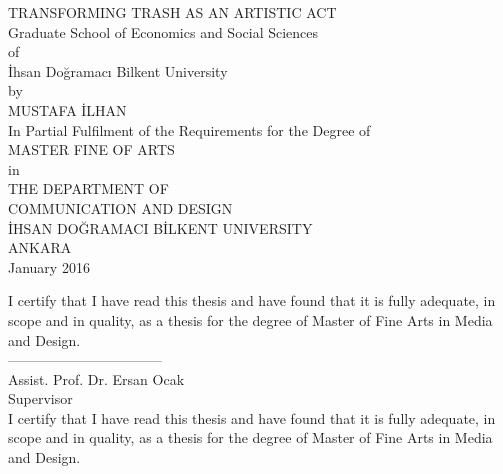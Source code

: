 \documentclass[12pt]{report}
\begin{document}
\clearpage
\thispagestyle{empty}
\singlespacing
	\begin{center}
        
        \vspace*{25mm}
        TRANSFORMING TRASH AS AN ARTISTIC ACT\\
        \vspace*{4\baselineskip}
        Graduate School of Economics and Social Sciences\\
        of\\
		İhsan Doğramacı Bilkent University\\
		\vspace*{3\baselineskip}
        by\\
       	\vspace*{3\baselineskip}
        MUSTAFA İLHAN\\
        \vspace*{4\baselineskip}
        In Partial Fulfilment of the Requirements for the Degree of\\
		MASTER FINE OF ARTS\\
        \vspace{2\baselineskip}
        in\\
        \vspace{2\baselineskip}
        THE DEPARTMENT OF\\
        COMMUNICATION AND DESIGN\\
       	İHSAN DOĞRAMACI BİLKENT UNIVERSITY\\
        ANKARA\\
        \vspace{\baselineskip}
        January 2016
	\end{center}
\clearpage


\clearpage
\thispagestyle{empty}
\singlespacing
\noindent I certify that I have read this thesis and have found that it is fully adequate, in scope and in quality, as a thesis for the degree of Master of Fine Arts in Media and Design.\\

\noindent---------------------------------\\
Assist. Prof. Dr. Ersan Ocak\\
Supervisor\\

\noindent I certify that I have read this thesis and have found that it is fully adequate, in scope and in quality, as a thesis for the degree of Master of Fine Arts in Media and Design.\\
\end{document}
